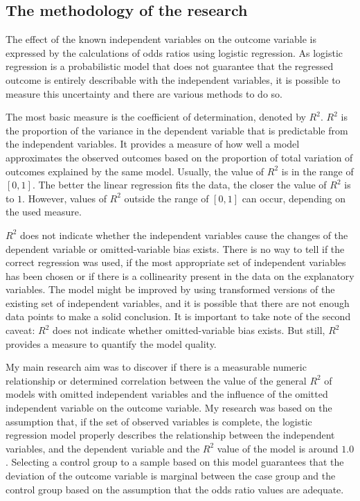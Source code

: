		\subsection{The methodology of the research}
										
		  
		The effect of the known independent variables on the outcome variable is expressed by the calculations of odds ratios using logistic regression. As logistic regression is a probabilistic model that does not guarantee that the regressed outcome is entirely describable with the independent variables, it is possible to measure this uncertainty and there are various methods to do so.
		
		The most basic measure is the coefficient of determination, denoted by $R^2$. $R^2$ is the proportion of the variance in the dependent variable that is predictable from the independent variables. It provides a measure of how well a model approximates the observed outcomes based on the proportion of total variation of outcomes explained by the same model. Usually, the value of $R^2$ is in the range of $[0,1]$. The better the linear regression fits the data, the closer the value of $R^2$ is to $1$. However, values of $R^2$ outside the range of $[0,1]$ can occur, depending on the used measure.
										
		$R^2$ does not indicate whether the independent variables cause the changes of the dependent variable or omitted-variable bias exists. There is no way to tell if the correct regression was used, if the most appropriate set of independent variables has been chosen or if there is a collinearity present in the data on the explanatory variables. The model might be improved by using transformed versions of the existing set of independent variables, and it is possible that there are not enough data points to make a solid conclusion. It is important to take note of the second caveat: $R^2$ does not indicate whether omitted-variable bias exists. But still, $R^2$ provides a measure to quantify the model quality.								
						
		My main research aim was to discover if there is a measurable numeric relationship or determined correlation between the value of the general $R^2$ of models with omitted independent variables and the influence of the omitted independent variable on the outcome variable. My research was based on the assumption that, if the set of observed variables is complete, the logistic regression model properly describes the relationship between the independent variables, and the dependent variable and the $R^2$ value of the model is around $1.0$. Selecting a control group to a sample based on this model guarantees that the deviation of the outcome variable is marginal between the case group and the control group based on the assumption that the odds ratio values are adequate.
		
